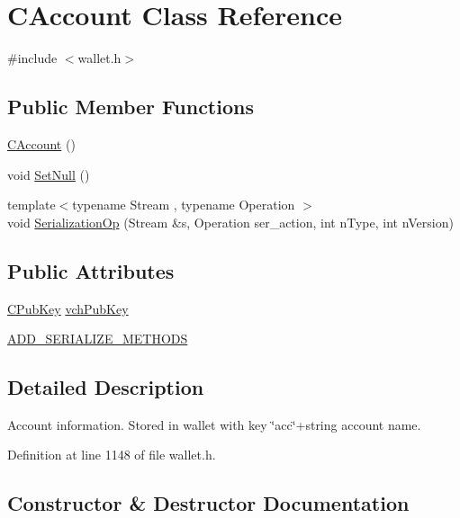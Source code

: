 \hypertarget{class_c_account}{}\section{C\+Account Class Reference}
\label{class_c_account}


{\ttfamily \#include $<$wallet.\+h$>$}

\subsection*{Public Member Functions}
\begin{DoxyCompactItemize}
\item 
\hyperlink{class_c_account_ab0a7f36214a23839cc8180a15b97f53f}{C\+Account} ()
\item 
void \hyperlink{class_c_account_ac63a4127fd899a21a5916a86588e809a}{Set\+Null} ()
\item 
{\footnotesize template$<$typename Stream , typename Operation $>$ }\\void \hyperlink{class_c_account_a645167419dead15544700e6ab2280a10}{Serialization\+Op} (Stream \&s, Operation ser\+\_\+action, int n\+Type, int n\+Version)
\end{DoxyCompactItemize}
\subsection*{Public Attributes}
\begin{DoxyCompactItemize}
\item 
\hyperlink{class_c_pub_key}{C\+Pub\+Key} \hyperlink{class_c_account_a8bc9b476371009c12a6c25d4c7264de5}{vch\+Pub\+Key}
\item 
\hyperlink{class_c_account_ad1054a718063912b1c5e1103eaa005cc}{A\+D\+D\+\_\+\+S\+E\+R\+I\+A\+L\+I\+Z\+E\+\_\+\+M\+E\+T\+H\+O\+D\+S}
\end{DoxyCompactItemize}


\subsection{Detailed Description}
Account information. Stored in wallet with key \char`\"{}acc\char`\"{}+string account name. 

Definition at line 1148 of file wallet.\+h.



\subsection{Constructor \& Destructor Documentation}
\hypertarget{class_c_account_ab0a7f36214a23839cc8180a15b97f53f}{}
